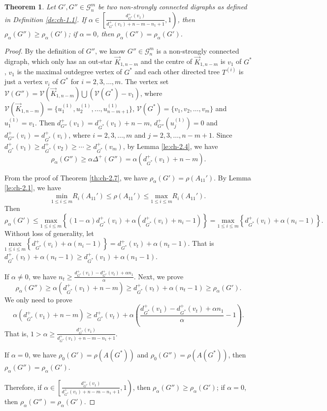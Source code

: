 \documentclass[11pt]{article}
\newtheorem{theorem}{Theorem}[section]
\begin{document}
\noindent\begin{theorem}\label{th:ch-2.8} Let $G',G''\in\mathcal{G}_n^m$ be two non-strongly connected digraphs as defined in Definition \ref{de:ch-1.1}. If $\alpha\in\left[\frac{d_{G^*}^+(v_1)}{d_{G^*}^+(v_1)+n-m-n_1+1},1\right)$, then $\rho_\alpha(G'')\geq\rho_\alpha(G')$; if $\alpha=0$, then $\rho_\alpha(G'')=\rho_\alpha(G')$.
\end{theorem}
\begin{proof}
By the definition of $G''$, we know $G''\in\mathcal{G}_n^m$ is a non-strongly connected digraph, which only has an out-star $\stackrel{\rightarrow}{K}_{1,n-m}$ and the centre of $\stackrel{\rightarrow}{K}_{1,n-m}$ is $v_1$ of $G^*$, $v_1$ is the maximal
outdegree vertex of $G^*$ and each other directed tree $T^{(i)}$ is just a vertex $v_i$ of $G^*$ for $i=2,3,\ldots,m$. The vertex set $\mathcal{V}(G'')=\mathcal{V}(\stackrel{\rightarrow}{K}_{1,n-m})\bigcup(\mathcal{V}(G^*)-v_1)$, where $\mathcal{V}(\stackrel{\rightarrow}{K}_{1,n-m})=\{u_1^{(1)},u_2^{(1)},\ldots,u_{n-m+1}^{(1)}\}$, $\mathcal{V}(G^*)=\{v_1,v_2,\ldots,v_m\}$ and $u_1^{(1)}=v_1$. Then $d_{G''}^+(v_1)=d_{G^*}^+(v_1)+n-m$, $d_{G''}^+(u_j^{(1)})=0$ and $d_{G''}^+(v_i)=d_{G^*}^+(v_i)$, where $i=2,3,\ldots,m$ and $j=2,3,\ldots,n-m+1$. Since $d_{G^*}^+(v_1)\geq d_{G^*}^+(v_2)\geq \cdots\geq d_{G^*}^+(v_m)$, by Lemma \ref{le:ch-2.4}, we have
$$\rho_\alpha(G'') \geq \alpha \Delta^+(G'')=\alpha\left(d_{G^*}^+(v_1)+n-m\right).$$

From the proof of Theorem \ref{th:ch-2.7}, we have $\rho_\alpha(G')=\rho(A_{11}')$. By Lemma \ref{le:ch-2.1}, we have
$$\underset{1\leq i\leq m}{\mathrm{min}} R_i(A_{11}')\leq \rho(A_{11}')\leq \underset{1\leq i\leq m}{\mathrm{max}} R_i(A_{11}').$$
Then
$$\rho_\alpha(G')\leq \underset{1\leq i\leq m}{\mathrm{max}} \left\{(1-\alpha)d_{G^*}^+(v_i)+\alpha\left(d_{G^*}^+(v_i)+n_i-1\right)\right\}=\underset{1\leq i\leq m}{\mathrm{max}} \left\{d_{G^*}^+(v_i)+\alpha(n_i-1)\right\}.$$
Without loss of generality, let $\underset{1\leq i\leq m}{\mathrm{max}} \left\{d_{G^*}^+(v_i)+\alpha(n_i-1)\right\}=d_{G^*}^+(v_t)+\alpha(n_t-1)$. That is $d_{G^*}^+(v_t)+\alpha(n_t-1)\geq d_{G^*}^+(v_1)+\alpha(n_1-1)$.

If $\alpha\neq0$, we have $n_t\geq\frac{d_{G^*}^+(v_1)-d_{G^*}^+(v_t)+\alpha n_1}{\alpha}$. Next, we prove
$$\rho_\alpha(G'')\geq \alpha\left(d_{G^*}^+(v_1)+n-m\right)\geq d_{G^*}^+(v_t)+\alpha(n_t-1)\geq \rho_\alpha(G').$$
We only need to prove
$$\alpha\left(d_{G^*}^+(v_1)+n-m\right)\geq d_{G^*}^+(v_t)+\alpha\left(\frac{d_{G^*}^+(v_1)-d_{G^*}^+(v_t)+\alpha n_1}{\alpha}-1\right).$$
That is, $1>\alpha\geq\frac{d_{G^*}^+(v_1)}{d_{G^*}^+(v_1)+n-m-n_1+1}$.

If $\alpha=0$, we have $\rho_0(G')=\rho(A(G^*))$ and $\rho_0(G'')=\rho(A(G^*))$, then $\rho_\alpha(G'')=\rho_\alpha(G')$.

Therefore, if $\alpha\in\left[\frac{d_{G^*}^+(v_1)}{d_{G^*}^+(v_1)+n-m-n_1+1},1\right)$, then $\rho_\alpha(G'')\geq\rho_\alpha(G')$; if $\alpha=0$, then $\rho_\alpha(G'')=\rho_\alpha(G')$.
\end{proof}
\end{document}
